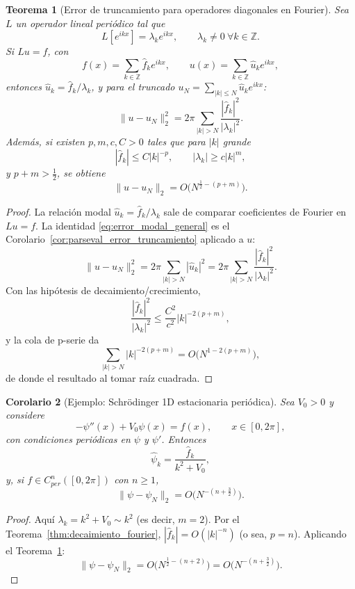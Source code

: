 \documentclass[a4paper,11pt]{report}
\newtheorem{theorem}{Teorema}[chapter]
\newtheorem{corollary}[theorem]{Corolario}
\begin{document}
\begin{theorem}[Error de truncamiento para operadores diagonales en Fourier]\label{thm:error_truncamiento_operador_modal}
Sea $L$ un operador lineal periódico tal que
\[
L[e^{ikx}] = \lambda_k e^{ikx},\qquad \lambda_k\neq 0\ \forall k\in\mathbb Z.
\]
Si $Lu=f$, con
\[
f(x)=\sum_{k\in\mathbb Z}\hat f_k e^{ikx},\qquad u(x)=\sum_{k\in\mathbb Z}\hat u_k e^{ikx},
\]
entonces $\hat u_k=\hat f_k/\lambda_k$, y para el truncado $u_N=\sum_{|k|\le N}\hat u_k e^{ikx}$:
\begin{equation}\label{eq:error_modal_general}
\|u-u_N\|_2^2
=2\pi\sum_{|k|>N}\frac{|\hat f_k|^2}{|\lambda_k|^2}.
\end{equation}
Además, si existen $p,m,c,C>0$ tales que para $|k|$ grande
\[
|\hat f_k|\le C|k|^{-p},\qquad |\lambda_k|\ge c|k|^{m},
\]
y $p+m>\tfrac12$, se obtiene
\[
\|u-u_N\|_2 = O\bigl(N^{\frac12-(p+m)}\bigr).
\]
\end{theorem}

\begin{proof}
La relación modal $\hat u_k=\hat f_k/\lambda_k$ sale de comparar coeficientes de Fourier en $Lu=f$. La identidad \eqref{eq:error_modal_general} es el Corolario~\ref{cor:parseval_error_truncamiento} aplicado a $u$:
\[
\|u-u_N\|_2^2=2\pi\sum_{|k|>N}|\hat u_k|^2
=2\pi\sum_{|k|>N}\frac{|\hat f_k|^2}{|\lambda_k|^2}.
\]
Con las hipótesis de decaimiento/crecimiento,
\[
\frac{|\hat f_k|^2}{|\lambda_k|^2}\le \frac{C^2}{c^2}|k|^{-2(p+m)},
\]
y la cola de p-serie da
\[
\sum_{|k|>N}|k|^{-2(p+m)}=O\bigl(N^{1-2(p+m)}\bigr),
\]
de donde el resultado al tomar raíz cuadrada.
\end{proof}

\begin{corollary}[Ejemplo: Schrödinger 1D estacionaria periódica]\label{cor:schrodinger_periodica_trunc}
Sea $V_0>0$ y considere
\[
-\psi''(x)+V_0\psi(x)=f(x),\qquad x\in[0,2\pi],
\]
con condiciones periódicas en $\psi$ y $\psi'$. Entonces
\[
\hat\psi_k=\frac{\hat f_k}{k^2+V_0},
\]
y, si $f\in C^n_{per}([0,2\pi])$ con $n\ge 1$,
\[
\|\psi-\psi_N\|_2 = O\bigl(N^{-(n+\frac32)}\bigr).
\]
\end{corollary}

\begin{proof}
Aquí $\lambda_k=k^2+V_0\sim k^2$ (es decir, $m=2$). Por el Teorema~\ref{thm:decaimiento_fourier}, $|\hat f_k|=O(|k|^{-n})$ (o sea, $p=n$). Aplicando el Teorema~\ref{thm:error_truncamiento_operador_modal}:
\[
\|\psi-\psi_N\|_2 = O\bigl(N^{\frac12-(n+2)}\bigr)=O\bigl(N^{-(n+\frac32)}\bigr).
\]
\end{proof}
\end{document}
